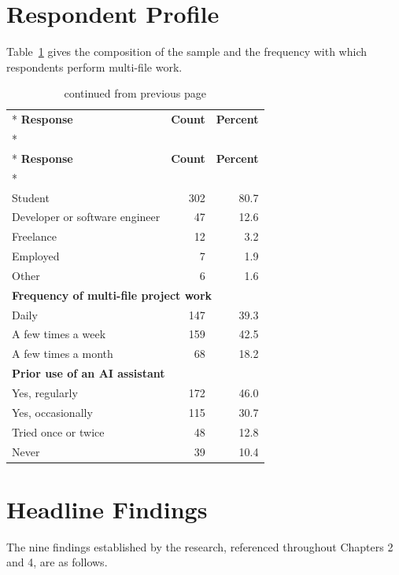 \documentclass{FastFyp}
\begin{document}
\section{Respondent Profile}
Table~\ref{tab:appprofile} gives the composition of the sample and the frequency with which respondents perform multi-file work.

{
\begin{longtable}{|p{6.0cm}|r|r|}
\caption{Respondent role and work frequency.}\label{tab:appprofile}\\*
\hline
\textbf{Response} & \textbf{Count} & \textbf{Percent} \\*
\hline
\endfirsthead
\caption[]{continued from previous page}\\*
\hline
\textbf{Response} & \textbf{Count} & \textbf{Percent} \\*
\hline
\endhead
\hline
\multicolumn{3}{|l|}{\textbf{Role}} \\
\hline
Student & 302 & 80.7 \\
\hline
Developer or software engineer & 47 & 12.6 \\
\hline
Freelance & 12 & 3.2 \\
\hline
Employed & 7 & 1.9 \\
\hline
Other & 6 & 1.6 \\
\hline
\multicolumn{3}{|l|}{\textbf{Frequency of multi-file project work}} \\
\hline
Daily & 147 & 39.3 \\
\hline
A few times a week & 159 & 42.5 \\
\hline
A few times a month & 68 & 18.2 \\
\hline
\multicolumn{3}{|l|}{\textbf{Prior use of an AI assistant}} \\
\hline
Yes, regularly & 172 & 46.0 \\
\hline
Yes, occasionally & 115 & 30.7 \\
\hline
Tried once or twice & 48 & 12.8 \\
\hline
Never & 39 & 10.4 \\
\hline
\end{longtable}
}

\section{Headline Findings}
The nine findings established by the research, referenced throughout Chapters 2 and 4, are as follows.
\end{document}
